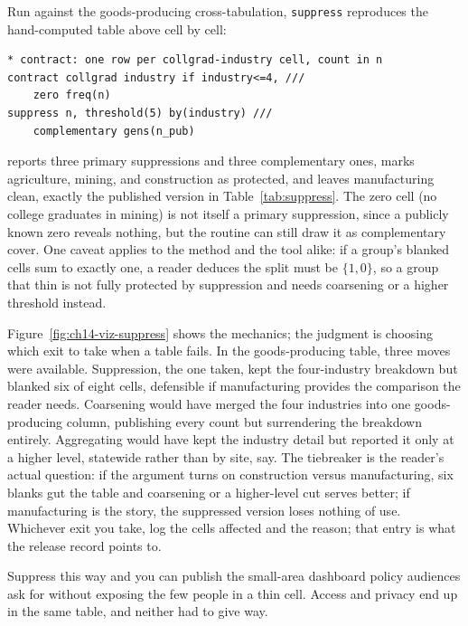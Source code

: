 \documentclass[
    a4paper,
    fontsize=10pt,
    twoside=true,
    numbers=noenddot,
]{kaobook}
\begin{document}
Run against the goods-producing cross-tabulation, \texttt{suppress} reproduces the hand-computed table above cell by cell:
\par
{\footnotesize
\begin{verbatim}
* contract: one row per collgrad-industry cell, count in n
contract collgrad industry if industry<=4, ///
    zero freq(n)
suppress n, threshold(5) by(industry) ///
    complementary gens(n_pub)
\end{verbatim}
}
reports three primary suppressions and three complementary ones, marks agriculture, mining, and construction as protected, and leaves manufacturing clean, exactly the published version in Table~\ref{tab:suppress}. The zero cell (no college graduates in mining) is not itself a primary suppression, since a publicly known zero reveals nothing, but the routine can still draw it as complementary cover. One caveat applies to the method and the tool alike: if a group's blanked cells sum to exactly one, a reader deduces the split must be $\{1,0\}$, so a group that thin is not fully protected by suppression and needs coarsening or a higher threshold instead.

Figure~\ref{fig:ch14-viz-suppress} shows the mechanics; the judgment is choosing which exit to take when a table fails. In the goods-producing table, three moves were available. Suppression, the one taken, kept the four-industry breakdown but blanked six of eight cells, defensible if manufacturing provides the comparison the reader needs. Coarsening would have merged the four industries into one goods-producing column, publishing every count but surrendering the breakdown entirely. Aggregating would have kept the industry detail but reported it only at a higher level, statewide rather than by site, say. The tiebreaker is the reader's actual question: if the argument turns on construction versus manufacturing, six blanks gut the table and coarsening or a higher-level cut serves better; if manufacturing is the story, the suppressed version loses nothing of use. Whichever exit you take, log the cells affected and the reason; that entry is what the release record points to.

Suppress this way and you can publish the small-area dashboard policy audiences ask for without exposing the few people in a thin cell. Access and privacy end up in the same table, and neither had to give way.
\end{document}
